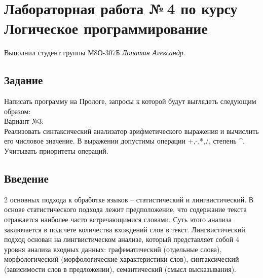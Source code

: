 \documentclass[12pt]{article}
\begin{document}
\section*{Лабораторная работа №\,4 по курсу Логическое программирование}

Выполнил студент группы М8О-307Б \textit{Лопатин Александр}.

\subsection*{Задание}
Написать программу на Прологе, запросы к которой будут выглядеть следующим
образом:\\
Вариант №3:\\
Реализовать синтаксический анализатор арифметического выражения и
вычислить его числовое значение. В выражении допустимы операции +,-,*,/,
степень \^{}. Учитывать приоритеты операций.

\subsection*{Введение}

2 основных подхода к обработке языков -- статистический и лингвистический. В основе статистического подхода лежит предположение, что содержание текста отражается наиболее часто встречающимися словами. Суть этого анализа заключается в подсчете количества вхождений слов в текст. Лингвистический подход основан на лингвистическом анализе, который представляет собой 4 уровня анализа входных данных: графематический (отдельные слова), морфологический (морфологические характеристики слов), синтаксический (зависимости слов в предложении), семантический (смысл высказывания).
\end{document}
